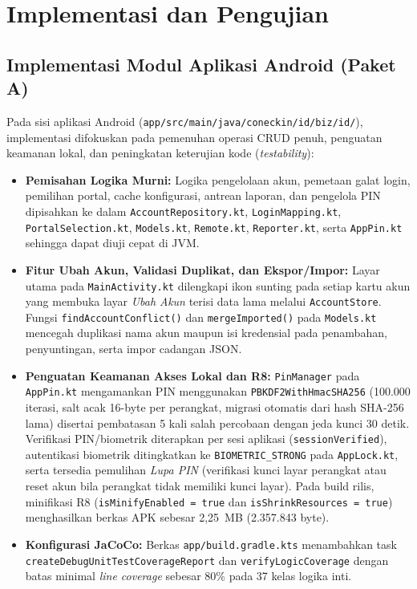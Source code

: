 \chapter{Implementasi dan Pengujian}

\section{Implementasi Modul Aplikasi Android (Paket A)}
Pada sisi aplikasi Android (\texttt{app/src/main/java/coneckin/id/biz/id/}), implementasi difokuskan pada pemenuhan operasi CRUD penuh, penguatan keamanan lokal, dan peningkatan keterujian kode (\textit{testability}):
\begin{itemize}[leftmargin=*]
  \item \textbf{Pemisahan Logika Murni:} Logika pengelolaan akun, pemetaan galat login, pemilihan portal, cache konfigurasi, antrean laporan, dan pengelola PIN dipisahkan ke dalam \texttt{AccountRepository.kt}, \texttt{LoginMapping.kt}, \texttt{PortalSelection.kt}, \texttt{Models.kt}, \texttt{Remote.kt}, \texttt{Reporter.kt}, serta \texttt{AppPin.kt} sehingga dapat diuji cepat di JVM.
  \item \textbf{Fitur Ubah Akun, Validasi Duplikat, dan Ekspor/Impor:} Layar utama pada \texttt{MainActivity.kt} dilengkapi ikon sunting pada setiap kartu akun yang membuka layar \textit{Ubah Akun} terisi data lama melalui \texttt{AccountStore}. Fungsi \texttt{findAccountConflict()} dan \texttt{mergeImported()} pada \texttt{Models.kt} mencegah duplikasi nama akun maupun isi kredensial pada penambahan, penyuntingan, serta impor cadangan JSON.
  \item \textbf{Penguatan Keamanan Akses Lokal dan R8:} \texttt{PinManager} pada \texttt{AppPin.kt} mengamankan PIN menggunakan \texttt{PBKDF2WithHmacSHA256} (100.000 iterasi, salt acak 16-byte per perangkat, migrasi otomatis dari hash SHA-256 lama) disertai pembatasan 5 kali salah percobaan dengan jeda kunci 30 detik. Verifikasi PIN/biometrik diterapkan per sesi aplikasi (\texttt{sessionVerified}), autentikasi biometrik ditingkatkan ke \texttt{BIOMETRIC\_STRONG} pada \texttt{AppLock.kt}, serta tersedia pemulihan \textit{Lupa PIN} (verifikasi kunci layar perangkat atau reset akun bila perangkat tidak memiliki kunci layar). Pada build rilis, minifikasi R8 (\texttt{isMinifyEnabled = true} dan \texttt{isShrinkResources = true}) menghasilkan berkas APK sebesar 2,25~MB (2.357.843 byte).
  \item \textbf{Konfigurasi JaCoCo:} Berkas \texttt{app/build.gradle.kts} menambahkan task \texttt{createDebugUnitTestCoverageReport} dan \texttt{verifyLogicCoverage} dengan batas minimal \textit{line coverage} sebesar 80\% pada 37 kelas logika inti.
\end{itemize}

